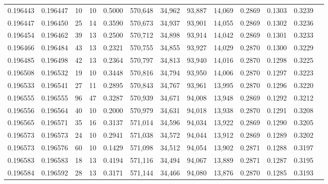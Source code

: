 \begin{tabular}{rrrrrrrrrrrrr}
0.196443 & 0.196447 &    10 &  10 &                                     0.5000 & 570,648 &  34,962 &  93,887 &  14,069 & 0.2869 & 0.1303 & 0.3239 \\
0.196447 & 0.196450 &    25 &  14 &                                     0.3590 & 570,673 &  34,937 &  93,901 &  14,055 & 0.2869 & 0.1302 & 0.3236 \\
0.196454 & 0.196462 &    39 &  13 &                                     0.2500 & 570,712 &  34,898 &  93,914 &  14,042 & 0.2869 & 0.1301 & 0.3233 \\
0.196466 & 0.196484 &    43 &  13 &                                     0.2321 & 570,755 &  34,855 &  93,927 &  14,029 & 0.2870 & 0.1300 & 0.3229 \\
0.196485 & 0.196498 &    42 &  13 &                                     0.2364 & 570,797 &  34,813 &  93,940 &  14,016 & 0.2870 & 0.1298 & 0.3225 \\
0.196508 & 0.196532 &    19 &  10 &                                     0.3448 & 570,816 &  34,794 &  93,950 &  14,006 & 0.2870 & 0.1297 & 0.3223 \\
0.196533 & 0.196541 &    27 &  11 &                                     0.2895 & 570,843 &  34,767 &  93,961 &  13,995 & 0.2870 & 0.1296 & 0.3220 \\
0.196555 & 0.196555 &    96 &  47 &                                     0.3287 & 570,939 &  34,671 &  94,008 &  13,948 & 0.2869 & 0.1292 & 0.3212 \\
0.196556 & 0.196564 &    40 &  10 &                                     0.2000 & 570,979 &  34,631 &  94,018 &  13,938 & 0.2870 & 0.1291 & 0.3208 \\
0.196565 & 0.196571 &    35 &  16 &                                     0.3137 & 571,014 &  34,596 &  94,034 &  13,922 & 0.2869 & 0.1290 & 0.3205 \\
0.196573 & 0.196573 &    24 &  10 &                                     0.2941 & 571,038 &  34,572 &  94,044 &  13,912 & 0.2869 & 0.1289 & 0.3202 \\
0.196573 & 0.196576 &    60 &  10 &                                     0.1429 & 571,098 &  34,512 &  94,054 &  13,902 & 0.2871 & 0.1288 & 0.3197 \\
0.196583 & 0.196583 &    18 &  13 &                                     0.4194 & 571,116 &  34,494 &  94,067 &  13,889 & 0.2871 & 0.1287 & 0.3195 \\
0.196584 & 0.196592 &    28 &  13 &                                     0.3171 & 571,144 &  34,466 &  94,080 &  13,876 & 0.2870 & 0.1285 & 0.3193 \\

\end{tabular}
